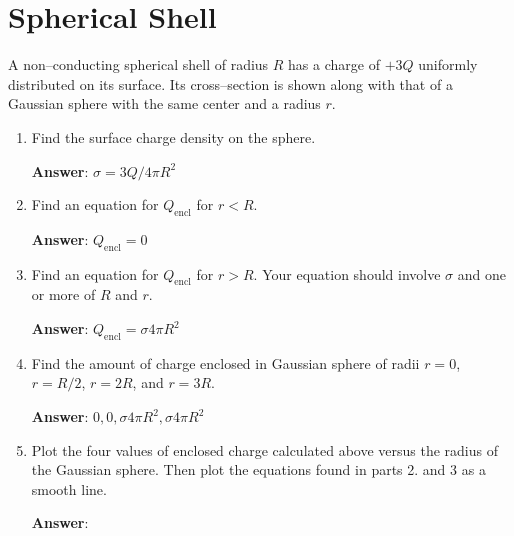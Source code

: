 \documentclass{article}
\begin{document}
\newpage

\section{Spherical Shell}

A non--conducting spherical shell of radius $R$ has a charge of $+3Q$ uniformly distributed on its surface. Its cross--section is shown along with that of a Gaussian sphere with the same center and a radius $r$.



\begin{enumerate}

  \item Find the surface charge density on the sphere.

        \ifsolutions
          \textbf{Answer}: $\sigma = 3Q/4\pi R^2$
        \else
          \vskip 36.135pt
        \fi

  \item Find an equation for $Q_{\text{encl}}$ for $r<R$.

        \ifsolutions
          \textbf{Answer}: $Q_{\text{encl}}=0$
        \else
          \vskip 36.135pt
        \fi

  \item Find an equation for $Q_{\text{encl}}$ for $r>R$. Your equation should involve $\sigma$ and one or more of $R$ and $r$.

        \ifsolutions
          \textbf{Answer}: $Q_{\text{encl}}=\sigma 4\pi R^2$
        \else
          \vskip 36.135pt
        \fi

  \item Find the amount of charge enclosed in Gaussian sphere of radii $r=0$, $r=R/2$, $r=2R$, and $r=3R$.

        \ifsolutions
          \textbf{Answer}: $0, 0, \sigma 4 \pi R^2, \sigma 4\pi R^2$
        \else
          \vskip 36.135pt
        \fi

  \item Plot the four values of enclosed charge calculated above versus the radius of the Gaussian sphere. Then plot the equations found in parts 2. and 3 as a smooth line.

        \ifsolutions
          \textbf{Answer}: 
        
          
        \fi

\end{enumerate}
\end{document}
